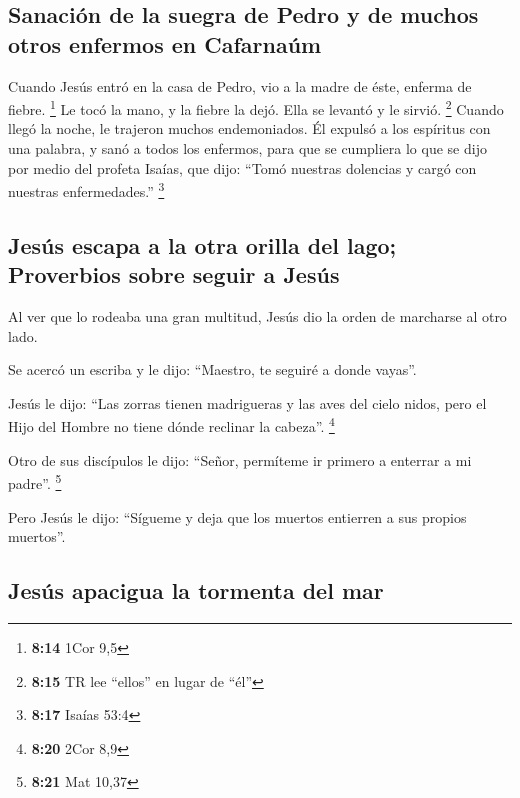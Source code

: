 \hypertarget{sanaciuxf3n-de-la-suegra-de-pedro-y-de-muchos-otros-enfermos-en-cafarnauxfam}{%
\subsection{Sanación de la suegra de Pedro y de muchos otros enfermos en
Cafarnaúm}\label{sanaciuxf3n-de-la-suegra-de-pedro-y-de-muchos-otros-enfermos-en-cafarnauxfam}}

 Cuando Jesús entró en la casa de Pedro, vio a la madre
de éste, enferma de fiebre. \footnote{\textbf{8:14} 1Cor 9,5}
 Le tocó la mano, y la fiebre la dejó. Ella se levantó y
le sirvió. \footnote{\textbf{8:15} TR lee ``ellos'' en lugar de ``él''}
 Cuando llegó la noche, le trajeron muchos endemoniados.
Él expulsó a los espíritus con una palabra, y sanó a todos los enfermos,
 para que se cumpliera lo que se dijo por medio del
profeta Isaías, que dijo: ``Tomó nuestras dolencias y cargó con nuestras
enfermedades.'' \footnote{\textbf{8:17} Isaías 53:4}

\hypertarget{jesuxfas-escapa-a-la-otra-orilla-del-lago-proverbios-sobre-seguir-a-jesuxfas}{%
\subsection{Jesús escapa a la otra orilla del lago; Proverbios sobre
seguir a
Jesús}\label{jesuxfas-escapa-a-la-otra-orilla-del-lago-proverbios-sobre-seguir-a-jesuxfas}}

 Al ver que lo rodeaba una gran multitud, Jesús dio la
orden de marcharse al otro lado.

 Se acercó un escriba y le dijo: ``Maestro, te seguiré a
donde vayas''.

 Jesús le dijo: ``Las zorras tienen madrigueras y las
aves del cielo nidos, pero el Hijo del Hombre no tiene dónde reclinar la
cabeza''. \footnote{\textbf{8:20} 2Cor 8,9}

 Otro de sus discípulos le dijo: ``Señor, permíteme ir
primero a enterrar a mi padre''. \footnote{\textbf{8:21} Mat 10,37}

 Pero Jesús le dijo: ``Sígueme y deja que los muertos
entierren a sus propios muertos''.

\hypertarget{jesuxfas-apacigua-la-tormenta-del-mar}{%
\subsection{Jesús apacigua la tormenta del
mar}\label{jesuxfas-apacigua-la-tormenta-del-mar}}

